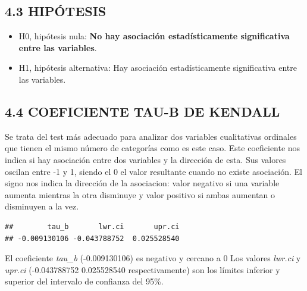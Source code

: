 \documentclass[
  12 pt,
  a4paper,
]{article}
\newenvironment{Shaded}{\begin{snugshade}}{\end{snugshade}}
\newcommand{\AttributeTok}[1]{\textcolor[rgb]{0.13,0.29,0.53}{#1}}
\newcommand{\FloatTok}[1]{\textcolor[rgb]{0.00,0.00,0.81}{#1}}
\newcommand{\FunctionTok}[1]{\textcolor[rgb]{0.13,0.29,0.53}{\textbf{#1}}}
\newcommand{\NormalTok}[1]{#1}
\newcommand{\OtherTok}[1]{\textcolor[rgb]{0.56,0.35,0.01}{#1}}
\newcommand{\SpecialCharTok}[1]{\textcolor[rgb]{0.81,0.36,0.00}{\textbf{#1}}}
\providecommand{\tightlist}{%
  \setlength{\itemsep}{0pt}\setlength{\parskip}{0pt}}
\begin{document}
\subsection{4.3 HIPÓTESIS}\label{hipuxf3tesis-2}

\begin{itemize}
\tightlist
\item
  H0, hipótesis nula: \textbf{No hay asociación estadísticamente
  significativa entre las variables}.
\item
  H1, hipótesis alternativa: Hay asociación estadísticamente
  significativa entre las variables.
\end{itemize}

\subsection{4.4 COEFICIENTE TAU-B DE
KENDALL}\label{coeficiente-tau-b-de-kendall}

Se trata del test más adecuado para analizar dos variables cualitativas
ordinales que tienen el mismo número de categorías como es este caso.
Este coeficiente nos indica si hay asociación entre dos variables y la
dirección de esta. Sus valores oscilan entre -1 y 1, siendo el 0 el
valor resultante cuando no existe asociación. El signo nos indica la
dirección de la asociacion: valor negativo si una variable aumenta
mientras la otra disminuye y valor positivo si ambas aumentan o
disminuyen a la vez.

\begin{Shaded}
\end{Shaded}

\begin{verbatim}
##        tau_b       lwr.ci       upr.ci 
## -0.009130106 -0.043788752  0.025528540
\end{verbatim}

El coeficiente \emph{tau\_b} (-0.009130106) es negativo y cercano a 0
Los valores \emph{lwr.ci} y \emph{upr.ci} (-0.043788752 0.025528540
respectivamente) son los límites inferior y superior del intervalo de
confianza del 95\%.
\end{document}
